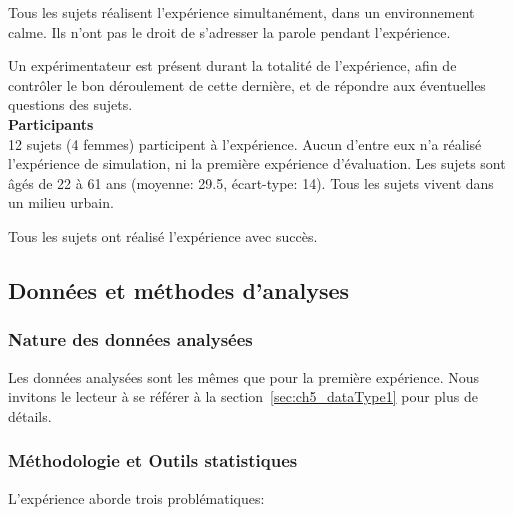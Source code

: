 Tous les sujets réalisent l'expérience simultanément, dans un environnement calme. Ils n'ont pas le droit de s'adresser la parole pendant l'expérience. 

Un expérimentateur est présent durant la totalité de l'expérience, afin de contrôler le bon déroulement de cette dernière, et de répondre aux éventuelles questions des sujets.  \\

\textbf{Participants} \\

12 sujets (4 femmes) participent à l'expérience. Aucun d'entre eux n'a réalisé l'expérience de simulation, ni la première expérience d'évaluation. Les sujets sont âgés de 22 à 61 ans (moyenne: 29.5, écart-type: 14). Tous les sujets vivent dans un milieu urbain.

Tous les sujets ont réalisé l'expérience avec succès.

\subsection{Données et méthodes d'analyses}

\subsubsection{Nature des données analysées}

Les données analysées sont les mêmes que pour la première expérience. Nous invitons le lecteur à se référer à la section~\ref{sec:ch5_dataType1} pour plus de détails.
 
\subsubsection{Méthodologie et Outils statistiques}
\label{sec:ch5_methodoEtStat2}

L'expérience aborde trois problématiques:

